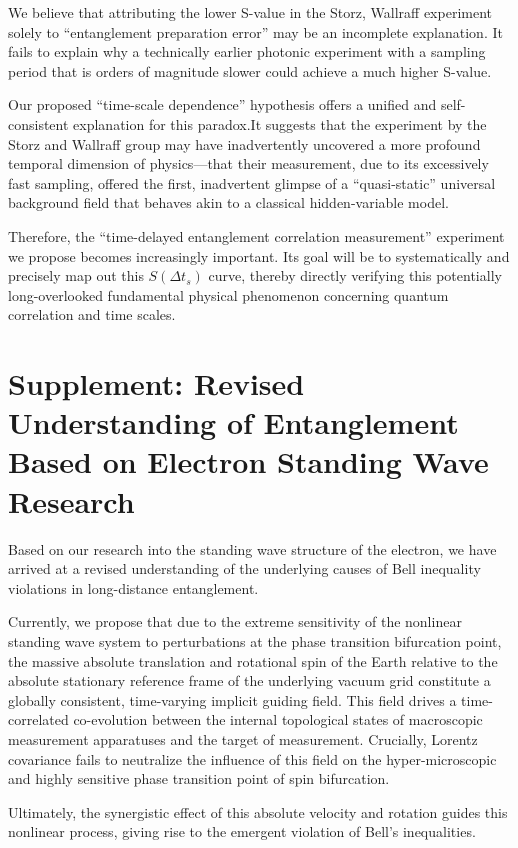 \documentclass[11pt]{article}
\begin{document}
We believe that attributing the lower S-value in the Storz, Wallraff experiment solely to ``entanglement preparation error'' may be an incomplete explanation. It fails to explain why a technically earlier photonic experiment with a sampling period that is orders of magnitude slower could achieve a much higher S-value.

Our proposed ``time-scale dependence'' hypothesis offers a unified and self-consistent explanation for this paradox.It suggests that the experiment by the Storz and Wallraff group may have inadvertently uncovered a more profound temporal dimension of physics---that their measurement, due to its excessively fast sampling, offered the first, inadvertent glimpse of a ``quasi-static'' universal background field that behaves akin to a classical hidden-variable model.

Therefore, the ``time-delayed entanglement correlation measurement'' experiment we propose becomes increasingly important. Its goal will be to systematically and precisely map out this $S(\Delta t_s)$ curve, thereby directly verifying this potentially long-overlooked fundamental physical phenomenon concerning quantum correlation and time scales.



\section{Supplement: Revised Understanding of Entanglement Based on Electron Standing Wave Research}

Based on our research into the standing wave structure of the electron, we have arrived at a revised understanding of the underlying causes of Bell inequality violations in long-distance entanglement.

Currently, we propose that due to the extreme sensitivity of the nonlinear standing wave system to perturbations at the phase transition bifurcation point, the massive absolute translation and rotational spin of the Earth relative to the absolute stationary reference frame of the underlying vacuum grid constitute a globally consistent, time-varying implicit guiding field. This field drives a time-correlated co-evolution between the internal topological states of macroscopic measurement apparatuses and the target of measurement. Crucially, Lorentz covariance fails to neutralize the influence of this field on the hyper-microscopic and highly sensitive phase transition point of spin bifurcation.

Ultimately, the synergistic effect of this absolute velocity and rotation guides this nonlinear process, giving rise to the emergent violation of Bell's inequalities.
\end{document}
